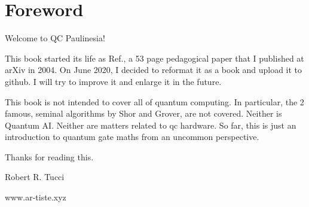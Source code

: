 \section{Foreword}
Welcome to QC Paulinesia!

This book started its life as Ref.\cite{origin}, a 53 page pedagogical paper that I published at arXiv in 2004. On June 2020,
I decided to reformat it as a book and 
upload it to github. I will
try to improve it and enlarge it 
in the future.

This book is not 
intended to
cover all of quantum computing. In particular, the 2 famous, seminal algorithms by Shor and Grover, are not covered. Neither is Quantum AI.
Neither are matters related to qc hardware. 
So far, this is just an introduction
to quantum gate
maths from an uncommon perspective.
 

\bigskip
\noindent Thanks for reading this.

\noindent Robert R. Tucci

\noindent www.ar-tiste.xyz